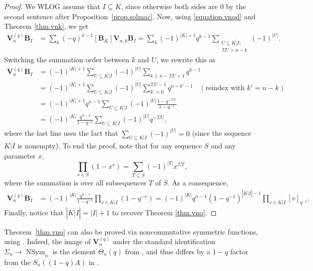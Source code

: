 \documentclass[revision]{FPSAC2025}
\newcommand{\VVq}{\mathbf{V}^{(q)}} %
\begin{document}
\begin{proof}
We WLOG assume that $I \subseteq K$, since otherwise both sides are $0$ by the second sentence after Proposition~\ref{prop.solmac}.
Now, using \eqref{equation.vnqd} and Theorem \ref{thm.vnk}, we get
\begin{align*}
[\mathbf{B}_K]\mathbf{V}^{(q)}_n\mathbf{B}_I &= \sum_{k} (-q)^{k-1} [\mathbf{B}_K]\mathbf{V}_{n,k}\mathbf{B}_I
= \sum_{k} (-1)^{|K|+1}q^{k-1}\sum_{\substack{U \subseteq \overline{ K|I};\\ \Sigma U > n-k} }(-1)^{|U|}.
\end{align*}
Switching the summation order between $k$ and $U$, we rewrite this as
\begin{align*}
[\mathbf{B}_K]\mathbf{V}^{(q)}_n\mathbf{B}_I &=(-1)^{|K|+1} \sum_{U \subseteq \overline{ K|I}}(-1)^{|U|} \sum_{k \geq n - \Sigma U +1} q^{k-1}\\
&=(-1)^{|K|+1} \sum_{U \subseteq \overline{ K|I}}(-1)^{|U|} \sum_{k'=0}^{\Sigma U -1}q^{n-k'-1} \ \ \ \ \left(
 \text{reindex with }k'=n-k \right)  \\
&=(-1)^{|K|+1}q^{n-1} \sum_{U \subseteq \overline{ K|I}}(-1)^{|U|} \frac{1 - q^{-\Sigma U}}{1-q^{-1}}\\
&=(-1)^{|K|}\frac{q^{n-1}}{1-q^{-1}} \sum_{U \subseteq \overline{ K|I}}(-1)^{|U|}q^{-\Sigma U} ,
\end{align*}
where the last line uses the fact that $
\sum_{U \subseteq \overline{ K|I}}(-1)^{|U|}=0$ (since the sequence $\overline{ K|I}$ is nonempty). To end the proof, note that for any sequence $S$ and any parameter $x$,
\[
\prod_{s \in S}(1-x^s) = \sum_{T \subseteq S}(-1)^{|T|}x^{\Sigma T},
\]
where the summation is over all subsequences $T$ of $S$. As a consequence,
\begin{align*}
[\mathbf{B}_K]\mathbf{V}^{(q)}_n\mathbf{B}_I &=(-1)^{|K|}\frac{q^{n-1}}{1-q^{-1}} \prod_{v \in \overline{ K|I}}(1-q^{-v})
=(-1)^{|K|}q^{n-1}(1-q^{-1})^{|\overline{ K|I}|-1} \prod_{v \in \overline{ K|I}}{[v]}_{q^{-1}}.
\end{align*}
Finally, notice that $|\overline{ K|I}| = |I|+1$ to recover Theorem \ref{thm.vnq}.
\end{proof}

Theorem~\ref{thm.vnq} can also be proved via noncommutative symmetric functions, using \cite[Proposition 5.30, Theorem 4.17, Definition 5.1, Proposition 5.2]{NCSF2}.
Indeed, the image of $\VVq_n$ under the standard identification $\Sigma_n \to \operatorname{NSym}_n$ is the element $\Theta_n(q)$ from \cite[(66)]{NCSF2}, and thus differs by a $1-q$ factor from the $S_n((1-q)A)$ in \cite[Proposition 5.2]{NCSF2}.
\end{document}
